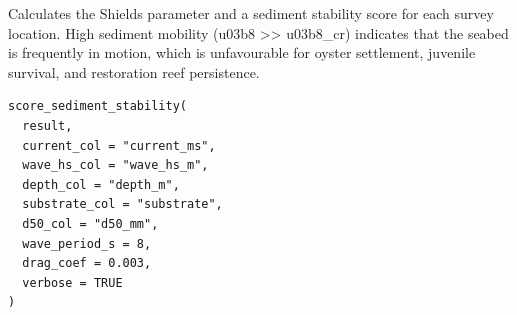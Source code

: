 \documentclass[a4paper]{book}
\begin{document}
%
\begin{Description}
Calculates the Shields parameter and a sediment stability score  for
each survey location. High sediment mobility (\bsl{}u03b8 >> \bsl{}u03b8\_cr) indicates that
the seabed is frequently in motion, which is unfavourable for oyster
settlement, juvenile survival, and restoration reef persistence.
\end{Description}
%
\begin{Usage}
\begin{verbatim}
score_sediment_stability(
  result,
  current_col = "current_ms",
  wave_hs_col = "wave_hs_m",
  depth_col = "depth_m",
  substrate_col = "substrate",
  d50_col = "d50_mm",
  wave_period_s = 8,
  drag_coef = 0.003,
  verbose = TRUE
)
\end{verbatim}
\end{Usage}
%
\end{document}
